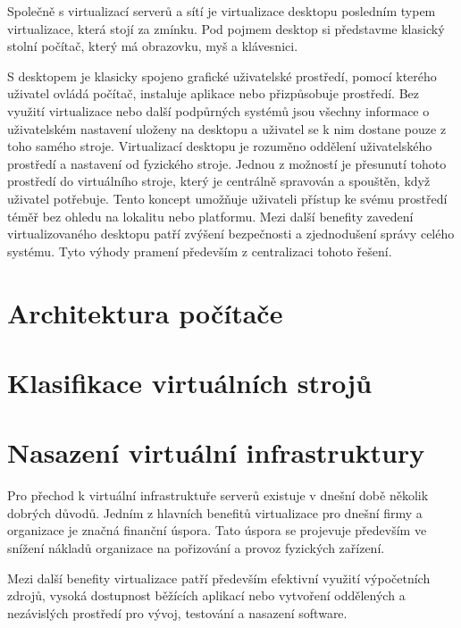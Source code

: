   Společně s virtualizací serverů a sítí je virtualizace desktopu posledním typem virtualizace, která stojí za zmínku. Pod pojmem desktop si představme klasický stolní počítač, který má obrazovku, myš a klávesnici.

  S desktopem je klasicky spojeno grafické uživatelské prostředí, pomocí kterého uživatel ovládá počítač, instaluje aplikace nebo přizpůsobuje prostředí. Bez využití virtualizace nebo další podpůrných systémů jsou 
  všechny informace o uživatelském nastavení uloženy na desktopu a uživatel se k nim dostane pouze z toho samého stroje. Virtualizací desktopu je rozuměno oddělení uživatelského prostředí a nastavení od fyzického
  stroje. Jednou z možností je přesunutí tohoto prostředí do virtuálního stroje, který je centrálně spravován a spouštěn, když uživatel potřebuje. Tento koncept umožňuje uživateli přístup ke svému prostředí téměř
  bez ohledu na lokalitu nebo platformu. Mezi další benefity zavedení virtualizovaného desktopu patří zvýšení bezpečnosti a zjednodušení správy celého systému. Tyto výhody pramení především z centralizaci tohoto
  řešení.

\section{Architektura počítače}
\label{section:computer_architecture}



\section{Klasifikace virtuálních strojů}
\label{section:clasification}


\section{Nasazení virtuální infrastruktury}
\label{section:vm_deployment}

Pro přechod k virtuální infrastruktuře serverů existuje v dnešní době několik dobrých důvodů. Jedním z hlavních benefitů virtualizace pro dnešní firmy a organizace je značná finanční úspora. Tato úspora se
projevuje především ve snížení nákladů organizace na pořizování a provoz fyzických zařízení. 

Mezi další benefity virtualizace patří především efektivní využití výpočetních zdrojů, vysoká dostupnost běžících aplikací nebo vytvoření oddělených a nezávislých prostředí pro vývoj, testování a nasazení software.

